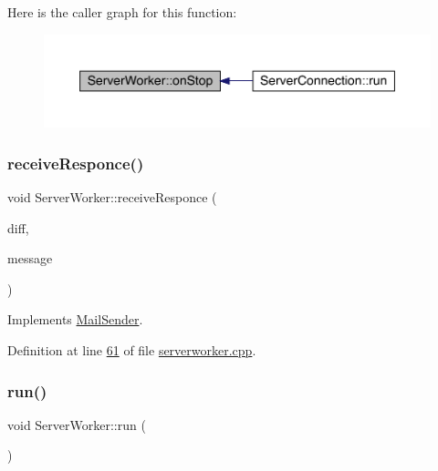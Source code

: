 Here is the caller graph for this function\+:
\nopagebreak
\begin{figure}[H]
\begin{center}
\leavevmode
\includegraphics[width=350pt]{de/df3/a00185_ab80ef665f93d81c71a83aa42f8d888df_icgraph}
\end{center}
\end{figure}
\mbox{\label{a00185_a2cfa275ffeff3aeee19058e8155763f5}} 
\subsubsection{\texorpdfstring{receive\+Responce()}{receiveResponce()}}
{\footnotesize\ttfamily void Server\+Worker\+::receive\+Responce (\begin{DoxyParamCaption}\item[{Q\+List$<$ \hyperlink{a00141}{Diff\+Element} $\ast$$>$ $\ast$}]{diff,  }\item[{\hyperlink{a00121}{Message\+For\+Server} $\ast$}]{message }\end{DoxyParamCaption})\hspace{0.3cm}{\ttfamily [virtual]}}



Implements \hyperlink{a00205_aba34437231a62861737e97d50f85e7e8}{Mail\+Sender}.



Definition at line \hyperlink{a00107_source_l00061}{61} of file \hyperlink{a00107_source}{serverworker.\+cpp}.

\mbox{\label{a00185_a8b4f9a11d13f0b4990ae72f87da010df}} 
\subsubsection{\texorpdfstring{run()}{run()}}
{\footnotesize\ttfamily void Server\+Worker\+::run (\begin{DoxyParamCaption}{ }\end{DoxyParamCaption})\hspace{0.3cm}{\ttfamily [protected]}}



